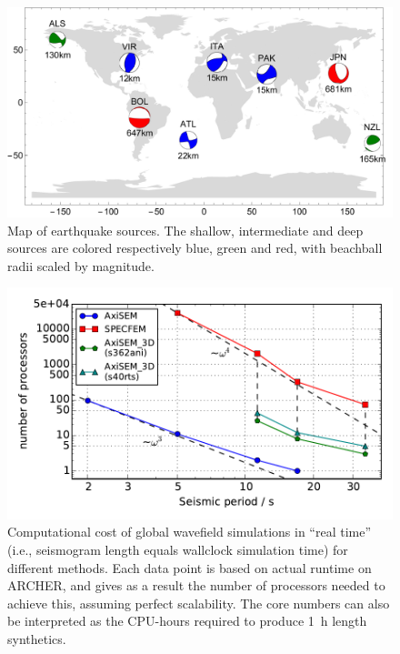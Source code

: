 \documentclass[extra,referee]{gji}
\begin{document}
\begin{figure}
  \centering
  \includegraphics[width=.7\textwidth]{fig/cmt/cmt.pdf}
  \caption{Map of earthquake sources. The shallow, intermediate 
  and deep sources are colored respectively blue, green and red,
  with beachball radii scaled by magnitude. }
  \label{fig:cmt}
\end{figure}   

\begin{figure}
  \centering
  \hspace{-10pt}\includegraphics[width=.7\textwidth]{fig/cost/cost.pdf} 
  \vspace{-20pt}
  \caption{Computational cost of global wavefield simulations in “real time” 
  (i.e., seismogram length equals wallclock simulation time) for different 
  methods. Each data point is based on actual runtime on ARCHER,
  and gives as a result the number of processors needed to achieve this, 
  assuming perfect scalability. The core numbers can also be interpreted 
  as the CPU-hours required to produce 1~h length synthetics.}
  \label{fig:logcost}
\end{figure} 
\end{document}
